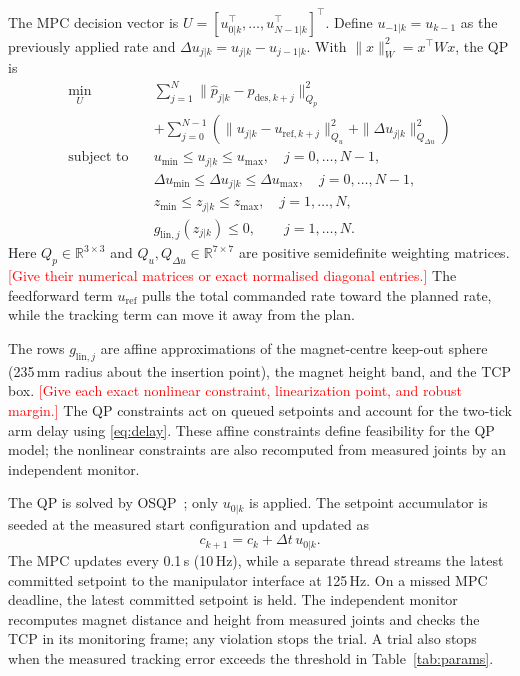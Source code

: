 \documentclass[journal]{IEEEtran}
\newcommand{\TBD}[1]{\textcolor{red}{[#1]}}
\begin{document}
The MPC decision vector is
$U=[u_{0|k}^\top,\ldots,u_{N-1|k}^\top]^\top$. Define
$u_{-1|k}=u_{k-1}$ as the previously applied rate and
$\Delta u_{j|k}=u_{j|k}-u_{j-1|k}$. With
$\|x\|_W^2=x^\top W x$, the QP is
\begin{equation}
\begin{aligned}
\min_U\quad&
\sum_{j=1}^{N}
\|\hat p_{j|k}-p_{\mathrm{des},k+j}\|_{Q_p}^2\\
&+\sum_{j=0}^{N-1}
\left(
\|u_{j|k}-u_{\mathrm{ref},k+j}\|_{Q_u}^2
+\|\Delta u_{j|k}\|_{Q_{\Delta u}}^2
\right)\\
\text{subject to}\quad&
u_{\min}\leq u_{j|k}\leq u_{\max},\quad j=0,\ldots,N-1,\\
&\Delta u_{\min}\leq\Delta u_{j|k}\leq\Delta u_{\max},\quad j=0,\ldots,N-1,\\
&z_{\min}\leq z_{j|k}\leq z_{\max},\quad j=1,\ldots,N,\\
&g_{\mathrm{lin},j}(z_{j|k})\leq0,
\qquad j=1,\ldots,N .
\end{aligned}
\label{eq:mpc}
\end{equation}
Here $Q_p\in\mathbb R^{3\times3}$ and
$Q_u,Q_{\Delta u}\in\mathbb R^{7\times7}$ are positive semidefinite
weighting matrices. \TBD{Give their numerical matrices or exact
normalised diagonal entries.} The feedforward term
$u_{\mathrm{ref}}$ pulls the total commanded rate toward the planned
rate, while the tracking term can move it away from the plan.

The rows $g_{\mathrm{lin},j}$ are affine approximations of the
magnet-centre keep-out sphere (235\,mm radius about the insertion
point), the magnet height band, and the TCP box. \TBD{Give each exact
nonlinear constraint, linearization point, and robust margin.}
The QP constraints act on queued setpoints and account for the two-tick arm
delay using \eqref{eq:delay}. These affine constraints define
feasibility for the QP model; the nonlinear constraints are also
recomputed from measured joints by an independent monitor.

The QP is solved by OSQP~\cite{osqp2020}; only $u_{0|k}$ is applied.
The setpoint accumulator is seeded at the measured start configuration
and updated as
\begin{equation}
c_{k+1}=c_k+\Delta t\,u_{0|k}.
\label{eq:accumulator}
\end{equation}
The MPC updates every 0.1\,s (10\,Hz), while a separate thread streams
the latest committed setpoint to the manipulator interface at 125\,Hz.
On a missed MPC deadline, the latest committed setpoint is held.
The independent monitor recomputes magnet distance and height from
measured joints and checks the TCP in its monitoring frame; any
violation stops the trial. A trial also stops when the measured
tracking error exceeds the threshold in Table~\ref{tab:params}.
\end{document}
